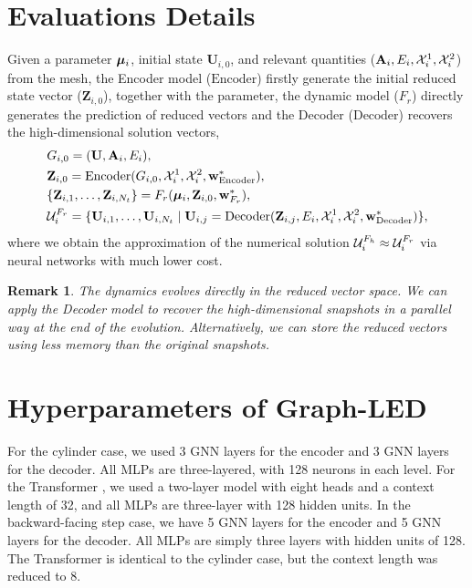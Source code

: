 \documentclass{article}
\newtheorem{remark}{Remark}
\begin{document}
\section{Evaluations Details}
Given a parameter ${\boldsymbol{\mu}}_i$, initial state $\mathbf{U}_{i,0}$, and relevant quantities ($\mathbf{A}_i,E_i,\mathcal{X}^1_{i},\mathcal{X}^2_{i}$) from the mesh, the Encoder model ($\mathrm{Encoder}$) firstly generate the initial reduced state vector ($\mathbf{Z}_{i,0}$), together with the parameter, the dynamic model ($F_r$) directly generates the prediction of reduced vectors and the Decoder ($\mathrm{Decoder}$) recovers the high-dimensional solution vectors,
\begin{equation}
    \begin{split}
    &G_{i,0}=(\mathbf{U}, \mathbf{A}_{i}, E_{i}),\\
  &      \mathbf{Z}_{i,0} = \mathrm{Encoder}(G_{i,0},\mathcal{X}^1_{i},\mathcal{X}^2_{i},\mathbf{w}^*_{\mathrm{Encoder}}),\\
 &       \{\mathbf{Z}_{i,1},\dots,\mathbf{Z}_{i,N_t}\} = F_r({\boldsymbol{\mu}}_{i}, \mathbf{Z}_{i,0},\mathbf{w}^*_{F_r}),\\
 &\mathcal{U}_{i}^{F_r} =  \{\mathbf{U}_{i,1},\dots,\mathbf{U}_{i,N_t}\mid \mathbf{U}_{i,j}=\mathrm{Decoder}(\mathbf{Z}_{i,j},E_{i},\mathcal{X}^1_{i},\mathcal{X}^2_{i},\mathbf{w}^*_{\mathrm{Decoder}}) \},
    \end{split}
\end{equation}
where we obtain the approximation of the numerical solution $\mathcal{U}_i^{F_h}\approx\mathcal{U}_i^{F_r}$ via neural networks with much lower cost.
\begin{remark}
The dynamics evolves directly in the reduced vector space. We can apply the Decoder model to recover the high-dimensional snapshots in a parallel way at the end of the evolution. Alternatively, we can store the reduced vectors using less memory than the original snapshots.
\end{remark}

\section{Hyperparameters of Graph-LED}
{For the cylinder case, we used 3 GNN layers for the encoder and 3 GNN layers for the decoder. All MLPs are three-layered, with 128 neurons in each level. For the Transformer \cite{radford2019language}, we used a two-layer model with eight heads and a context length of 32, and all MLPs are three-layer with 128 hidden units.
In the backward-facing step case, we have 5 GNN layers for the encoder and 5 GNN layers for the decoder. All MLPs are simply three layers with hidden units of 128. The Transformer is identical to the cylinder case, but the context length was reduced to 8.}
\end{document}
